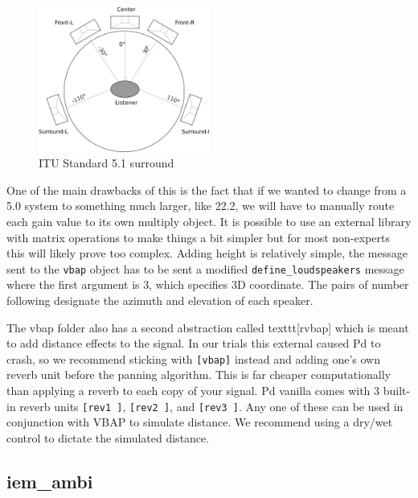 \begin{figure}[ht!]%
\centering
\includegraphics[width=0.5\textwidth]{img/5-1-surr.png} 
\caption{ITU Standard 5.1 surround \cite{File51su81-online}}
\label{fig:5-1-itu}
\end{figure}


One of the main drawbacks of this is the fact that if we wanted to change from a 5.0 system to something much larger, like 22.2, we will have to manually route each gain value to its own multiply object. It is possible to use an external library with matrix operations to make things a bit simpler but for most non-experts this will likely prove too complex. Adding height is relatively simple, the message sent to the \texttt{vbap} object has to be sent a modified \texttt{define\_loudspeakers} message where the first argument is 3, which specifies 3D coordinate. The pairs of number following designate the azimuth and elevation of each speaker. 

The vbap folder also has a second abstraction called texttt{[rvbap]} which is meant to add distance effects to the signal. In our trials this external caused Pd to crash, so we recommend sticking with \texttt{[vbap]} instead and adding one's own reverb unit before the panning algorithm. This is far cheaper computationally than applying a reverb to each copy of your signal. Pd vanilla comes with 3 built-in reverb units \texttt{[rev1~]}, \texttt{[rev2~]}, and \texttt{[rev3~]}. Any one of these can be used in conjunction with VBAP to simulate distance. We recommend using a dry/wet control to dictate the simulated distance. 

\subsection{iem\_ambi}

